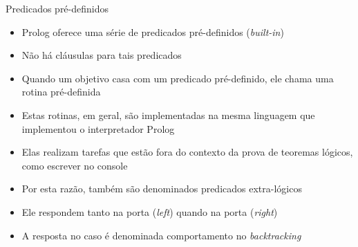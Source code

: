 \begin{frame}[fragile]{Predicados pré-definidos}

    \begin{itemize}
        \item Prolog oferece uma série de predicados pré-definidos (\textit{built-in})

        \item Não há cláusulas para tais predicados

        \item Quando um objetivo casa com um predicado pré-definido, ele chama uma rotina 
            pré-definida

        \item Estas rotinas, em geral, são implementadas na mesma linguagem que implementou o 
            interpretador Prolog 

        \item Elas realizam tarefas que estão fora do contexto da prova de teoremas lógicos, 
            como escrever no console 

        \item Por esta razão, também são denominados predicados extra-lógicos 

        \item Ele respondem tanto na porta  (\textit{left}) quando na 
            porta  (\textit{right})

        \item A resposta no caso  é denominada comportamento no 
            \textit{backtracking}

    \end{itemize}

\end{frame}

